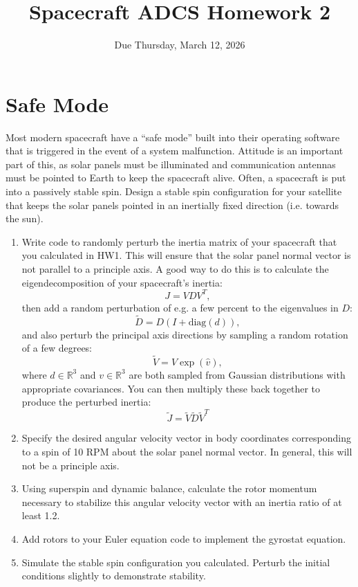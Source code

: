 \documentclass[11pt,letterpaper]{article}
\title{Spacecraft ADCS Homework 2}
\author{Due Thursday, March 12, 2026}
\date{}
\begin{document}
\maketitle

\section{Safe Mode}

Most modern spacecraft have a ``safe mode'' built into their operating software that is triggered in the event of a system malfunction. Attitude is an important part of this, as solar panels must be illuminated and communication antennas must be pointed to Earth to keep the spacecraft alive. Often, a spacecraft is put into a passively stable spin. Design a stable spin configuration for your satellite that keeps the solar panels pointed in an inertially fixed direction (i.e. towards the sun). 
\begin{enumerate}
	\item Write code to randomly perturb the inertia matrix of your spacecraft that you calculated in HW1. This will ensure that the solar panel normal vector is not parallel to a principle axis. A good way to do this is to calculate the eigendecomposition of your spacecraft's inertia:
	\begin{equation*}
		J = VDV^T ,
	\end{equation*}
	then add a random perturbation of e.g. a few percent to the eigenvalues in $D$:
	\begin{equation*}
		\tilde{D} = D(I + \mathrm{diag}(d)) ,
	\end{equation*}
	and also perturb the principal axis directions by sampling a random rotation of a few degrees:
	\begin{equation*}
		\tilde{V} = V \exp (\hat{v}) ,
	\end{equation*}
	where $d \in \mathbb{R}^3$ and $v \in \mathbb{R}^3$ are both sampled from Gaussian distributions with appropriate covariances. You can then multiply these back together to produce the perturbed inertia:
	\begin{equation*}
		\tilde{J} = \tilde{V}\tilde{D}\tilde{V}^T
	\end{equation*}
	\item Specify the desired angular velocity vector in body coordinates corresponding to a spin of 10 RPM about the solar panel normal vector. In general, this will not be a principle axis.
	\item Using superspin and dynamic balance, calculate the rotor momentum necessary to stabilize this angular velocity vector with an inertia ratio of at least 1.2.
	\item Add rotors to your Euler equation code to implement the gyrostat equation.
	\item Simulate the stable spin configuration you calculated. Perturb the initial conditions slightly to demonstrate stability.
\end{enumerate}
\end{document}
